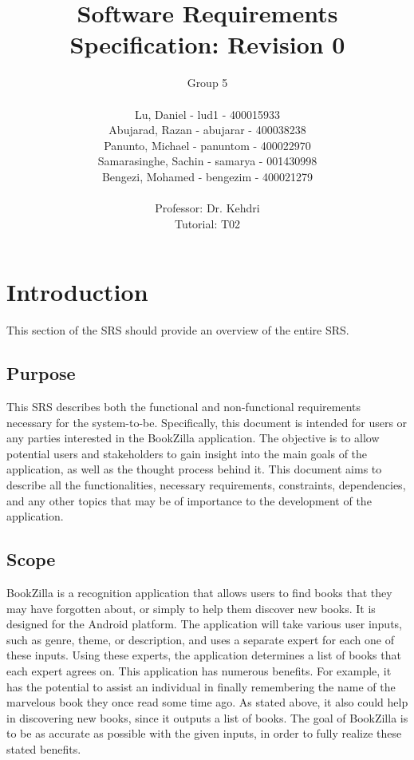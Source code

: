 \documentclass[12pt, titlepage, a4paper]{article}
\title{Software Requirements Specification: Revision 0}
\author{Group 5 \\
            \\ Lu, Daniel - lud1  - 400015933
            \\ Abujarad, Razan - abujarar  - 400038238
            \\ Panunto, Michael - panuntom - 400022970
            \\ Samarasinghe, Sachin - samarya - 001430998
            \\ Bengezi, Mohamed - bengezim - 400021279 \\
            \\ Professor: Dr. Kehdri
            \\ Tutorial: T02}
\begin{document}
\setlength{\arrayrulewidth}{1.5pt}

\maketitle
\newpage


{\centering
\tableofcontents\par
}

\newpage


\section{Introduction}
\label{sec:introduction}

This section of the SRS should provide an overview of the entire SRS.

\subsection{Purpose}
\label{sub:purpose}
\tab This SRS describes both the functional and non-functional requirements necessary for the system-to-be. Specifically, this document is intended for users or any parties interested in the BookZilla application. The objective is to allow potential users and stakeholders to gain insight into the main goals of the application, as well as the thought process behind it. This document aims to describe all the functionalities, necessary requirements, constraints, dependencies, and any other topics that may be of importance to the development of the application.

\subsection{Scope}
\label{sub:scope}
\tab BookZilla is a recognition application that allows users to find books that they may have forgotten about, or simply to help them discover new books. It is designed for the Android platform. The application will take various user inputs, such as genre, theme, or description, and uses a separate expert for each one of these inputs. Using these experts, the application determines a list of books that each expert agrees on. This application has numerous benefits. For example, it has the potential to assist an individual in finally remembering the name of the marvelous book they once read some time ago. As stated above, it also could help in discovering new books, since it outputs a list of books. The goal of BookZilla is to be as accurate as possible with the given inputs, in order to fully realize these stated benefits.
\end{document}
